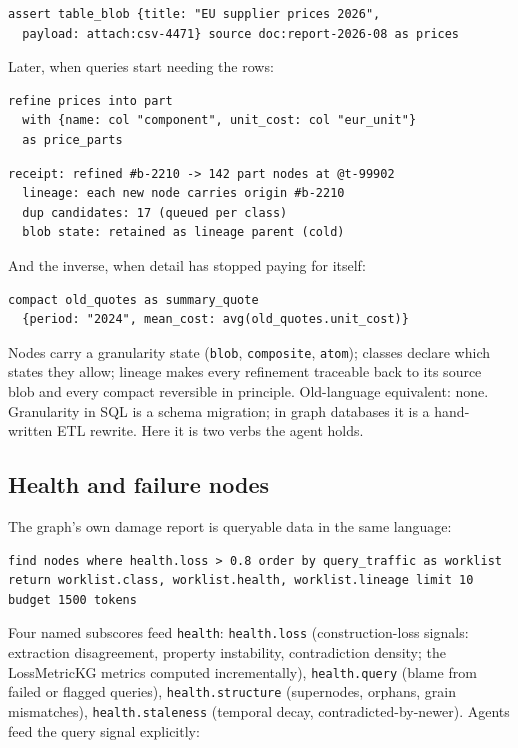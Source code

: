 \documentclass[11pt]{article}
\begin{document}
\begin{lstlisting}[style=new]
assert table_blob {title: "EU supplier prices 2026",
  payload: attach:csv-4471} source doc:report-2026-08 as prices
\end{lstlisting}

Later, when queries start needing the rows:

\begin{lstlisting}[style=new]
refine prices into part
  with {name: col "component", unit_cost: col "eur_unit"}
  as price_parts
\end{lstlisting}

\begin{lstlisting}[style=result]
receipt: refined #b-2210 -> 142 part nodes at @t-99902
  lineage: each new node carries origin #b-2210
  dup candidates: 17 (queued per class)
  blob state: retained as lineage parent (cold)
\end{lstlisting}

And the inverse, when detail has stopped paying for itself:

\begin{lstlisting}[style=new]
compact old_quotes as summary_quote
  {period: "2024", mean_cost: avg(old_quotes.unit_cost)}
\end{lstlisting}

Nodes carry a granularity state (\texttt{blob}, \texttt{composite}, \texttt{atom}); classes declare which states they allow; lineage makes every refinement traceable back to its source blob and every compact reversible in principle. Old-language equivalent: none. Granularity in SQL is a schema migration; in graph databases it is a hand-written ETL rewrite. Here it is two verbs the agent holds.

\subsection{Health and failure nodes}

The graph's own damage report is queryable data in the same language:

\begin{lstlisting}[style=new]
find nodes where health.loss > 0.8 order by query_traffic as worklist
return worklist.class, worklist.health, worklist.lineage limit 10
budget 1500 tokens
\end{lstlisting}

Four named subscores feed \texttt{health}: \texttt{health.loss} (construction-loss signals: extraction disagreement, property instability, contradiction density; the LossMetricKG metrics computed incrementally), \texttt{health.query} (blame from failed or flagged queries), \texttt{health.structure} (supernodes, orphans, grain mismatches), \texttt{health.staleness} (temporal decay, contradicted-by-newer). Agents feed the query signal explicitly:
\end{document}

